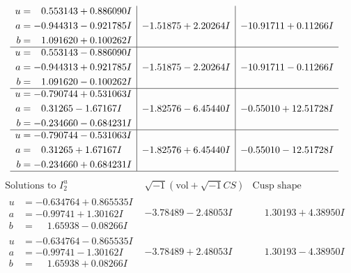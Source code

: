 \documentclass[1p]{elsarticle_modified}
\theoremstyle{definition}
\newcommand{\I}{\sqrt{-1}}
\begin{document}
$$\begin{array}{c|c|c}
\begin{aligned}
u &= \phantom{-}0.553143 + 0.886090 I \\
a &= -0.944313 - 0.921785 I \\
b &= \phantom{-}1.091620 + 0.100262 I\end{aligned}
 & -1.51875 + 2.20264 I & -10.91711 + 0.11266 I \\ \hline\begin{aligned}
u &= \phantom{-}0.553143 - 0.886090 I \\
a &= -0.944313 + 0.921785 I \\
b &= \phantom{-}1.091620 - 0.100262 I\end{aligned}
 & -1.51875 - 2.20264 I & -10.91711 - 0.11266 I \\ \hline\begin{aligned}
u &= -0.790744 + 0.531063 I \\
a &= \phantom{-}0.31265 - 1.67167 I \\
b &= -0.234660 - 0.684231 I\end{aligned}
 & -1.82576 - 6.45440 I & -0.55010 + 12.51728 I \\ \hline\begin{aligned}
u &= -0.790744 - 0.531063 I \\
a &= \phantom{-}0.31265 + 1.67167 I \\
b &= -0.234660 + 0.684231 I\end{aligned}
 & -1.82576 + 6.45440 I & -0.55010 - 12.51728 I\\
 \hline 
 \end{array}$$\newpage$$\begin{array}{c|c|c}  
\text{Solutions to }I^u_{2}& \I (\text{vol} + \sqrt{-1}CS) & \text{Cusp shape}\\
 \hline 
\begin{aligned}
u &= -0.634764 + 0.865535 I \\
a &= -0.99741 + 1.30162 I \\
b &= \phantom{-}1.65938 - 0.08266 I\end{aligned}
 & -3.78489 - 2.48053 I & \phantom{-}1.30193 + 4.38950 I \\ \hline\begin{aligned}
u &= -0.634764 - 0.865535 I \\
a &= -0.99741 - 1.30162 I \\
b &= \phantom{-}1.65938 + 0.08266 I\end{aligned}
 & -3.78489 + 2.48053 I & \phantom{-}1.30193 - 4.38950 I \\ \hline\begin{aligned}

\end{aligned}
\end{array}$$
\end{document}
